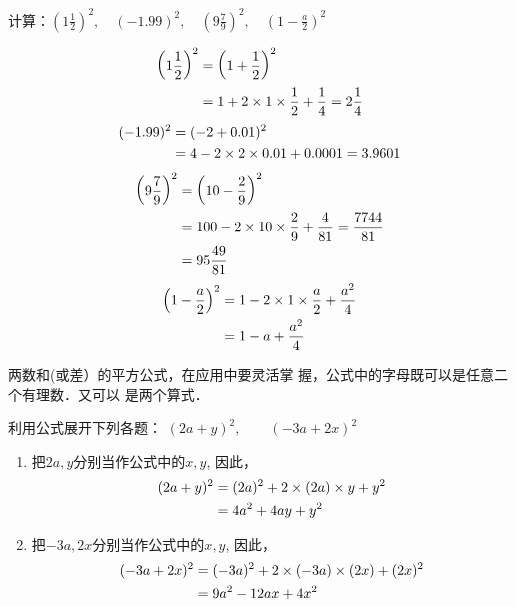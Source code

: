 \begin{example}
计算：$\left(1\frac{1}{2}\right)^2,\quad (-1.99)^2,\quad \left(9\frac{7}{9}\right)^2,\quad \left(1-\frac{a}{2}\right)^2$
\end{example}

\begin{solution}
\[\begin{split}
    \left(1\dfrac{1}{2}\right)^2 &=\left(1+\dfrac{1}{2}\right)^2\\
    &=1+2\times1\times\dfrac{1}{2}+\dfrac{1}{4}=2\dfrac{1}{4}
\end{split}\]
\[\begin{split}
    (-1.99)^2&=(-2+0.01)^2\\
    &=4-2\times 2\times 0.01+0.0001=3.9601
\end{split}\]
\[\begin{split}
    \left(9\dfrac{7}{9}\right)^2&=\left(10-\dfrac{2}{9}\right)^2\\
    &=100-2\times 10\times \dfrac{2}{9}+\dfrac{4}{81}=\dfrac{7744}{81}\\
    &=95\dfrac{49}{81}
\end{split}\]
\[\begin{split}
    \left(1-\dfrac{a}{2}\right)^2&=1-2\times 1\times \dfrac{a}{2}+\dfrac{a^2}{4}\\
    &=1-a+\dfrac{a^2}{4}
\end{split}\]
\end{solution}

两数和(或差）的平方公式，在应用中要灵活掌
握，公式中的字母既可以是任意二个有理数．又可以
是两个算式．


\begin{example}
    利用公式展开下列各题：
$(2a+y)^2,\qquad (-3a+2x)^2$
\end{example}


\begin{solution}
\begin{enumerate}
    \item 把$2a,y$分别当作公式中的$x,y$, 因此，
\[\begin{split}
    (2a+y)^2&=(2a)^2+2\times(2a)\times y+y^2\\
&=4a^2+4ay+y^2
\end{split}\]
\item 把$-3a,2x$分别当作公式中的$x,y$, 因此，
\[\begin{split}
    (-3a+2x)^2&=(-3a)^2+2\times(-3a)\times(2x)+(2x)^2\\
    &= 9a^2-12ax+4x^2
\end{split}\]
\end{enumerate}
\end{solution}
    


